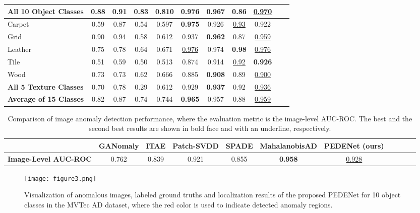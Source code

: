\documentclass{article}
\begin{document}
\begin{table*}[!htbp]
\begin{center}
\begin{adjustbox}{width=1.0\textwidth,center}
\begin{tabular}{|l|c|c|c|c|c|c|c|c|c|c}
      \textbf{All 10 Object Classes} & 0.88 & 0.91 & 0.83  & 0.810 & \textbf{0.976} &  0.967 & 0.86 & \underline{0.970} \\ \hline
      Carpet & 0.59 & 0.87 & 0.54 & 0.597 & \textbf{0.975} & 0.926 & \underline{0.93} & 0.922 \\
      Grid & 0.90 & 0.94 & 0.58 & 0.612 & 0.937 & \textbf{0.962} & 0.87 & \underline{0.959} \\ 
      Leather & 0.75 & 0.78 & 0.64 & 0.671 & \underline{0.976} & 0.974 & \textbf{0.98} & \underline{0.976} \\
      Tile & 0.51 & 0.59 & 0.50 & 0.513 & 0.874 & 0.914 & \underline{0.92} & \textbf{0.926} \\
      Wood & 0.73 & 0.73 & 0.62 & 0.666 & 0.885 & \textbf{0.908} & 0.89 & \underline{0.900} \\ \hline
      \textbf{All 5 Texture Classes} & 0.70 & 0.78 & 0.29 & 0.612 & 0.929 & \textbf{0.937}  & 0.92 & \underline{0.936}\\ \hline
      \textbf{Average of 15 Classes} & 0.82 & 0.87 & 0.74 &  0.744 & \textbf{0.965} & 0.957 & 0.88 & \underline{0.959} \\ \hline
    \end{tabular}
  \end{adjustbox}
  \end{center}
\end{table*}


\begin{table*}[!htbp]
\begin{center}
\caption{Comparison of image anomaly detection performance, where the
evaluation metric is the image-level AUC-ROC. The best and the second best results
are shown in bold face and with an underline, respectively.}\label{tab2}
    \begin{tabular}{|l|c|c|c|c|c|c|c|c|c|c}
      \hline
      \textbf{} & GANomaly & ITAE & Patch-SVDD & SPADE & MahalanobisAD  & PEDENet (ours) \\ \hline
      \textbf{Image-Level AUC-ROC} & 0.762 & 0.839 & 0.921 & 0.855 & \textbf{0.958} & \underline{0.928} \\
      \hline
    \end{tabular}
  \end{center}
\end{table*}


\begin{figure*}[!t]
\centering
\texttt{[image: figure3.png]}
\caption{Visualization of anomalous images, labeled ground truths and
localization results of the proposed PEDENet for 10 object classes in 
the MVTec AD dataset, where the red color is used to indicate detected 
anomaly regions.} \label{fig:5}
\end{figure*}
\end{document}

